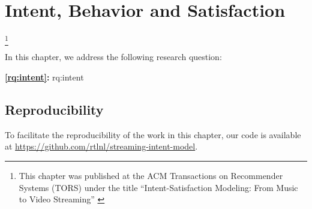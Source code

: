 
\chapter{Intent, Behavior and Satisfaction}
\label{chapter:research-intent}

\footnote[]{This chapter was published at the ACM Transactions on Recommender Systems (TORS) under the title ``Intent-Satisfaction Modeling: From Music to Video Streaming'' \citep{intent}}
\acresetall


In this chapter, we address the following research question:

\medskip
\noindent
\textbf{\ref{rq:intent}:} \acl{rq:intent}
\medskip

\noindent


% 
% 
% 
% 
% 
% 
% 



\section*{Reproducibility}
To facilitate the reproducibility of the work in this chapter, our code is available at \url{https://github.com/rtlnl/streaming-intent-model}.